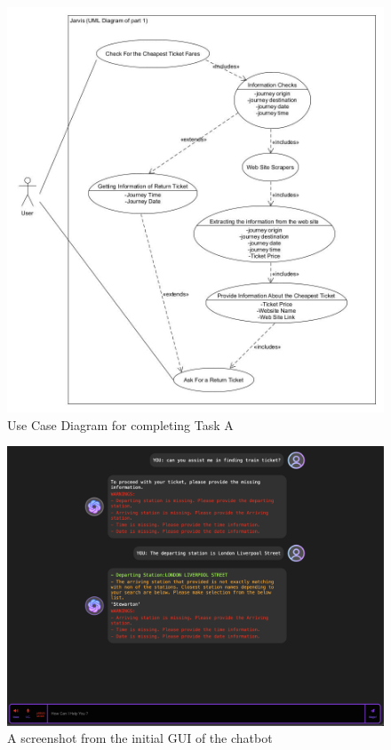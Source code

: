 \begin{figure}[!htbp]
    \centering
    \includegraphics[width=1.0\linewidth]{Diagrams/ChatBot_UML_part_1.jpg}
    \caption{Use Case Diagram for completing Task A}
    \label{Fig: User-case Diagram}
\end{figure}

\begin{figure}[!htbp]
    \centering
    \includegraphics[width=\textwidth]{Diagrams/Example_of_GUI.png}
    \caption{A screenshot from the initial GUI of the chatbot}
    \label{Fig: GUI Example}
\end{figure}

